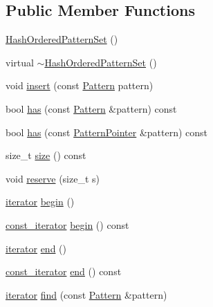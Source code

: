 \subsection*{Public Member Functions}
\begin{DoxyCompactItemize}
\item 
\hyperlink{classHashOrderedPatternSet_a045167c1a12c5e9e6dca775c2080a7b0}{Hash\+Ordered\+Pattern\+Set} ()
\item 
virtual \hyperlink{classHashOrderedPatternSet_acabae5fd5eb84ef383deb562a4cef808}{$\sim$\+Hash\+Ordered\+Pattern\+Set} ()
\item 
void \hyperlink{classHashOrderedPatternSet_a9da0aaf61e7b1425a181da16ccef6a1b}{insert} (const \hyperlink{classPattern}{Pattern} pattern)
\item 
bool \hyperlink{classHashOrderedPatternSet_ac21ec186302af16a3b70c5c85e434510}{has} (const \hyperlink{classPattern}{Pattern} \&pattern) const 
\item 
bool \hyperlink{classHashOrderedPatternSet_a4d917cedc8386b463aae0ad86856c82a}{has} (const \hyperlink{classPatternPointer}{Pattern\+Pointer} \&pattern) const 
\item 
size\+\_\+t \hyperlink{classHashOrderedPatternSet_a42fee5ee6f163edf807623ffc6ab2617}{size} () const 
\item 
void \hyperlink{classHashOrderedPatternSet_ac61b634d5e115949f2955dc85c3babe3}{reserve} (size\+\_\+t s)
\item 
\hyperlink{classHashOrderedPatternSet_a3191eb8aa122dfe2bf819d37468bd0b6}{iterator} \hyperlink{classHashOrderedPatternSet_a94bf915d870e33639c80839d7da7ce54}{begin} ()
\item 
\hyperlink{classHashOrderedPatternSet_a5e1bbb1c4ef5ee0937bc0d5251a8d97e}{const\+\_\+iterator} \hyperlink{classHashOrderedPatternSet_a82869ce8a41f6f5d45ffca4cd4f4133c}{begin} () const 
\item 
\hyperlink{classHashOrderedPatternSet_a3191eb8aa122dfe2bf819d37468bd0b6}{iterator} \hyperlink{classHashOrderedPatternSet_ada3bb2f1617443ad288c5c22dcd33ec0}{end} ()
\item 
\hyperlink{classHashOrderedPatternSet_a5e1bbb1c4ef5ee0937bc0d5251a8d97e}{const\+\_\+iterator} \hyperlink{classHashOrderedPatternSet_a0bd639de898189b047a8432292d18392}{end} () const 
\item 
\hyperlink{classHashOrderedPatternSet_a3191eb8aa122dfe2bf819d37468bd0b6}{iterator} \hyperlink{classHashOrderedPatternSet_aaf005777860a7af872aa104b1b7f9895}{find} (const \hyperlink{classPattern}{Pattern} \&pattern)

\end{DoxyCompactItemize}
